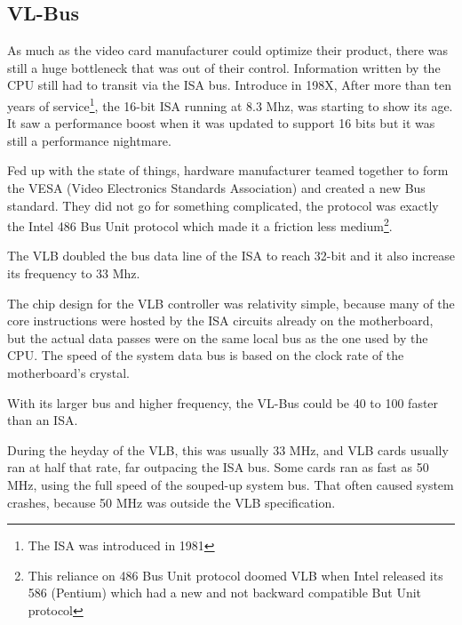 \subsection{VL-Bus}
As much as the video card manufacturer could optimize their product, there was still a huge bottleneck that was out of their control. Information written by the CPU still had to transit via the ISA bus. Introduce in 198X, After more than ten years of service\footnote{The ISA was introduced in 1981}, the 16-bit ISA running at 8.3 Mhz, was starting to show its age. It saw a performance boost when it was updated to support 16 bits but it was still a performance nightmare.\\
\par
{}
\par
Fed up with the state of things, hardware manufacturer teamed together to form the VESA (Video Electronics Standards Association) and created a new Bus standard. They did not go for something complicated, the protocol was exactly the Intel 486 Bus Unit protocol which made it a friction less medium\footnote{This reliance on 486 Bus Unit protocol doomed VLB when Intel released its 586 (Pentium) which had a new and not backward compatible But Unit protocol}.\\
\par 
The VLB doubled the bus data line of the ISA to reach 32-bit and it also increase its frequency to 33 Mhz.\\
\par
The chip design for the VLB controller was relativity simple, because many of the core instructions were hosted by the ISA circuits already on the motherboard, but the actual data passes were on the same local bus as the one used by the CPU.
The speed of the system data bus is based on the clock rate of the motherboard's crystal. 
\par
With its larger bus and higher frequency, the VL-Bus could be 40 to 100 faster than an ISA. \\
\par
During the heyday of the VLB, this was usually 33 MHz, and VLB cards usually ran at half that rate, far outpacing the ISA bus. Some cards ran as fast as 50 MHz, using the full speed of the souped-up system bus. That often caused system crashes, because 50 MHz was outside the VLB specification.\\
\par

